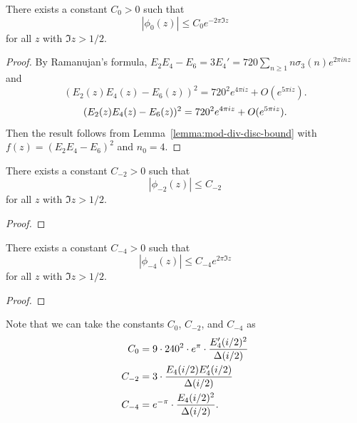 \begin{corollary}\label{cor:phi0-bound}\leanok
There exists a constant $C_0 > 0$ such that
\begin{equation}\label{eqn:phi0-bound}
|\phi_0(z)| \le C_0 e^{-2 \pi \Im z}
\end{equation}
for all $z$ with $\Im z > 1/2$.
\end{corollary}
\begin{proof}\leanok
By Ramanujan's formula, $E_2 E_4 - E_6 = 3E_4' = 720 \sum_{n \ge 1} n \sigma_3(n) e^{2 \pi i n z}$ and
\ifplastex
\begin{equation*}
    (E_2(z) E_4(z) - E_6(z))^{2} = 720^{2} e^{4 \pi i z} + O(e^{5 \pi i z}).
\end{equation*}
\else
\begin{equation}
    (E_2(z) E_4(z) - E_6(z))^{2} = 720^{2} e^{4 \pi i z} + O(e^{5 \pi i z}). \notag
\end{equation}
\fi
Then the result follows from Lemma~\ref{lemma:mod-div-disc-bound} with $f(z) = (E_2 E_4 - E_6)^2$ and $n_0 = 4$.
\end{proof}

\begin{corollary}\label{cor:phi2-bound}\leanok
There exists a constant $C_{-2} > 0$ such that
\begin{equation}\label{eqn:phi2-bound}
    |\phi_{-2}(z)| \le C_{-2}
\end{equation}
for all $z$ with $\Im z > 1/2$.
\end{corollary}
\begin{proof}\leanok
\end{proof}

\begin{corollary}\label{cor:phi4-bound}\leanok
There exists a constant $C_{-4} > 0$ such that
\begin{equation}\label{eqn:phi4-bound}
    |\phi_{-4}(z)| \le C_{-4} e^{2 \pi \Im z}
\end{equation}
for all $z$ with $\Im z > 1/2$.
\end{corollary}
\begin{proof}\leanok
\end{proof}

Note that we can take the constants $C_0$, $C_{-2}$, and $C_{-4}$ as
\begin{align}
    C_0 &= 9 \cdot 240^2 \cdot e^{\pi} \cdot \frac{E_4'(i/2)^{2}}{\Delta(i/2)} \notag \\
    C_{-2} &= 3 \cdot \frac{E_4(i/2) E_4'(i/2)}{\Delta(i/2)} \notag \\
    C_{-4} &= e^{-\pi} \cdot \frac{E_4(i/2)^{2}}{\Delta(i/2)}. \notag
\end{align}

